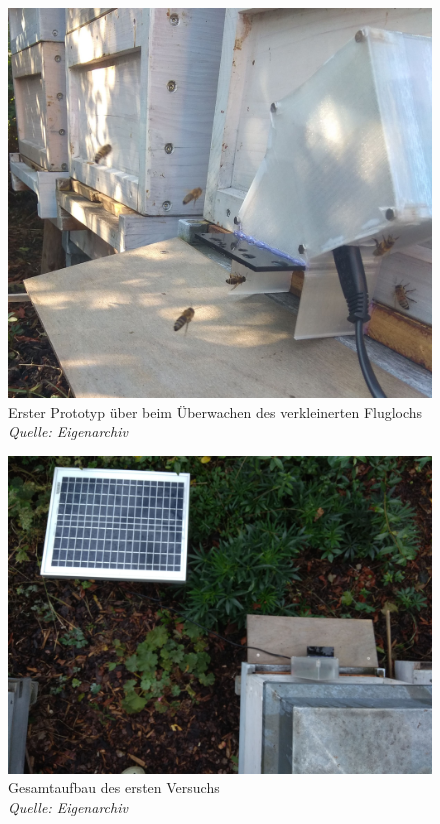\documentclass[11pt,a4paper]{article}
\begin{document}
\begin{figure}[H] \label{fig:first-generation-1}
    \centering
    \includegraphics[width=.8\textwidth]{images/first_prototype_on_hive.jpg}
    \caption{Erster Prototyp über beim Überwachen des verkleinerten Fluglochs \\
    \textit{Quelle: Eigenarchiv}}
\end{figure}
\begin{figure}[H] \label{fig:first-generation-2}
    \centering
    \includegraphics[width=.8\textwidth]{images/first_prototype_birds_eye_view.jpg}
    \caption{Gesamtaufbau des ersten Versuchs \\
    \textit{Quelle: Eigenarchiv}}
\end{figure}
\end{document}
